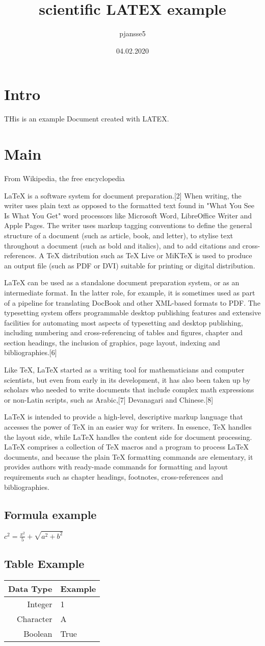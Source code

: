 \documentclass{scrartcl}
\date{04.02.2020}
\author{pjansse5}
\title{scientific LATEX example}
\begin{document}
\maketitle
\tableofcontents

\section{Intro}
THis is an example Document created with LATEX.
\section{Main}
From Wikipedia, the free encyclopedia

LaTeX is a software system for document preparation.[2] When writing, the writer uses plain text as opposed to the formatted text found in "What You See Is What You Get" word processors like Microsoft Word, LibreOffice Writer and Apple Pages. The writer uses markup tagging conventions to define the general structure of a document (such as article, book, and letter), to stylise text throughout a document (such as bold and italics), and to add citations and cross-references. A TeX distribution such as TeX Live or MiKTeX is used to produce an output file (such as PDF or DVI) suitable for printing or digital distribution.

LaTeX can be used as a standalone document preparation system, or as an intermediate format. In the latter role, for example, it is sometimes used as part of a pipeline for translating DocBook and other XML-based formats to PDF. The typesetting system offers programmable desktop publishing features and extensive facilities for automating most aspects of typesetting and desktop publishing, including numbering and cross-referencing of tables and figures, chapter and section headings, the inclusion of graphics, page layout, indexing and bibliographies.[6]

Like TeX, LaTeX started as a writing tool for mathematicians and computer scientists, but even from early in its development, it has also been taken up by scholars who needed to write documents that include complex math expressions or non-Latin scripts, such as Arabic,[7] Devanagari and Chinese.[8]

LaTeX is intended to provide a high-level, descriptive markup language that accesses the power of TeX in an easier way for writers. In essence, TeX handles the layout side, while LaTeX handles the content side for document processing. LaTeX comprises a collection of TeX macros and a program to process LaTeX documents, and because the plain TeX formatting commands are elementary, it provides authors with ready-made commands for formatting and layout requirements such as chapter headings, footnotes, cross-references and bibliographies.
\subsection{Formula example}
$c^{2}=\frac{ x^{2} }{5}+\sqrt{ a^{2}+b^{2} }$
\subsection{Table Example}
\begin{tabular}[t]{rl}
Data Type & Example\\
\hline
Integer & 1\\
Character & A\\
Boolean & True\\
\end{tabular}
\end{document}
